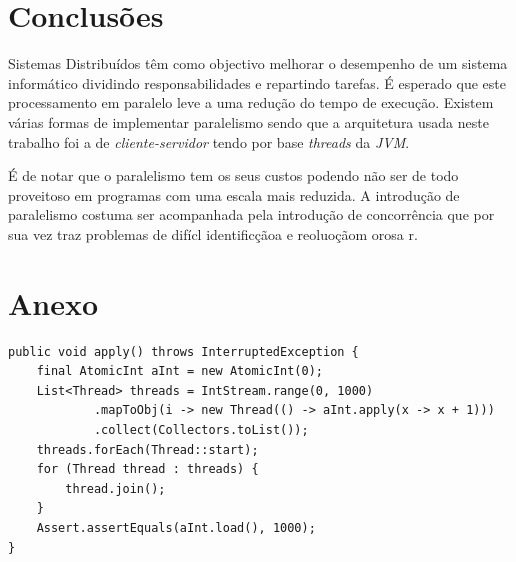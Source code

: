 \documentclass[a4paper]{article}
\begin{document}
\section{Conclusões}
Sistemas Distribuídos têm como objectivo melhorar o desempenho de um sistema informático dividindo responsabilidades e repartindo tarefas. É esperado que este processamento em paralelo leve a uma redução do tempo de execução.
Existem várias formas de implementar paralelismo sendo que a arquitetura usada neste trabalho foi a de \textit{cliente-servidor} tendo por base \textit{threads} da \textit{JVM}. 

É de notar que o paralelismo tem os seus custos podendo não ser de todo proveitoso em programas com uma escala mais reduzida. A introdução de paralelismo costuma ser acompanhada pela introdução de concorrência que por sua vez traz problemas de difícl identificçãoa e reoluoçãom orosa r. 


\pagebreak
\section{Anexo}
\begin{verbatim}
public void apply() throws InterruptedException {
    final AtomicInt aInt = new AtomicInt(0);
    List<Thread> threads = IntStream.range(0, 1000)
            .mapToObj(i -> new Thread(() -> aInt.apply(x -> x + 1)))
            .collect(Collectors.toList());
    threads.forEach(Thread::start);
    for (Thread thread : threads) {
        thread.join();
    }
    Assert.assertEquals(aInt.load(), 1000);
}
\end{verbatim}
\end{document}

